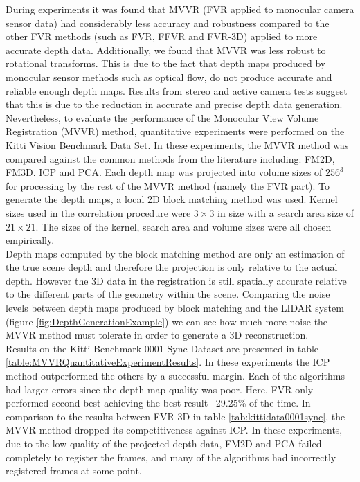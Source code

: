 
During experiments it was found that MVVR (FVR applied to monocular camera sensor data) had considerably less accuracy and robustness compared to the other FVR methods (such as FVR, FFVR and FVR-3D) applied to more accurate depth data. Additionally, we found that MVVR was less robust to rotational transforms. This is due to the fact that depth maps produced by monocular sensor methods such as optical flow, do not produce accurate and reliable enough depth maps. Results from stereo and active camera tests suggest that this is due to the reduction in accurate and precise depth data generation. \\

Nevertheless, to evaluate the performance of the Monocular View Volume Registration (MVVR) method, quantitative experiments were performed on the Kitti Vision Benchmark Data Set. In these experiments, the MVVR method was compared against the common methods from the literature including: FM2D, FM3D. ICP and PCA.  Each depth map was projected into volume sizes of $256^3$ for processing by the rest of the MVVR method (namely the FVR part). To generate the depth maps, a local 2D block matching method was used. Kernel sizes used in the correlation procedure were $3 \times 3$ in size with a search area size of $21 \times 21$. The sizes of the kernel, search area and volume sizes were all chosen empirically. \\

Depth maps computed by the block matching method are only an estimation of the true scene depth and therefore the projection is only relative to the actual depth. However the 3D data in the registration is still spatially accurate relative to the different parts of the geometry within the scene. Comparing the noise levels between depth maps produced by block matching and the LIDAR system (figure \ref{fig:DepthGenerationExample}) we can see how much more noise the MVVR method must tolerate in order to generate a 3D reconstruction. \\

Results on the Kitti Benchmark 0001 Sync Dataset are presented in table \ref{table:MVVRQuantitativeExperimentResults}. In these experiments the ICP method outperformed the others by a successful margin. Each of the algorithms had larger errors since the depth map quality was poor. Here, FVR only performed second best achieving the best result ~29.25\% of the time. In comparison to the results between FVR-3D in table \ref{tab:kittidata0001sync}, the MVVR method dropped its competitiveness against ICP. In these experiments, due to the low quality of the projected depth data, FM2D and PCA failed completely to register the frames, and many of the algorithms had incorrectly registered frames at some point.

